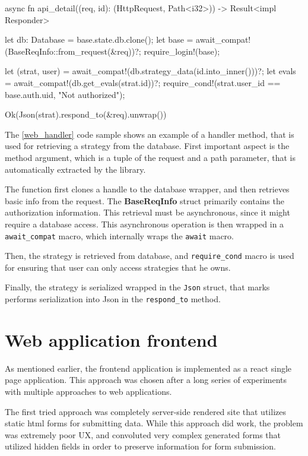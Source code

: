 \begin{code}[language=rust,label={web_handler},caption={Example web handler function}]
async fn api_detail((req, id): (HttpRequest, Path<i32>))
        -> Result<impl Responder> {
    let db: Database = base.state.db.clone();
    let base = await_compat!(BaseReqInfo::from_request(&req))?;
    require_login!(base);

    let (strat, user) = await_compat!(db.strategy_data(id.into_inner()))?;
    let evals = await_compat!(db.get_evals(strat.id))?;
    require_cond!(strat.user_id == base.auth.uid, "Not authorized");

    Ok(Json(strat).respond_to(&req).unwrap())
}
\end{code}

The \autoref{web_handler} code sample shows an example of a handler method, that is used for retrieving a strategy from the database.
First important aspect is the method argument, which is a tuple of the request and a path parameter, that is automatically extracted by
the library.

The function first clones a handle to the database wrapper, and then retrieves basic info from the request.
The \textbf{BaseReqInfo} struct primarily contains the authorization information. This retrieval must be asynchronous,
since it might require a database access. This asynchronous operation is then wrapped in a \verb|await_compat| macro, which internally wraps
the \verb|await| macro.

Then, the strategy is retrieved from database, and \verb|require_cond| macro is used for ensuring that user can only access strategies that he owns.

Finally, the strategy is serialized wrapped in the \verb|Json| struct, that marks performs serialization into Json in the
\verb|respond_to| method.

\section{Web application frontend}
As mentioned earlier, the frontend application is implemented as a react single page application.
This approach was chosen after a long series of experiments with multiple approaches to web applications.

The first tried approach was completely server-side rendered site that utilizes static html forms for
submitting data. While this approach did work, the problem was extremely poor UX, and convoluted
very complex generated forms that utilized hidden fields in order to preserve information
for form submission.

